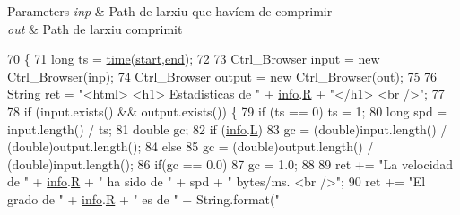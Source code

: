 \begin{DoxyParams}{Parameters}
{\em inp} & Path de l\textquotesingle{}arxiu que havíem de comprimir \\
\hline
{\em out} & Path de l\textquotesingle{}arxiu comprimit \\
\hline
\end{DoxyParams}

\begin{DoxyCode}
70                                                            \{
71         \textcolor{keywordtype}{long} ts = \hyperlink{classdomini_1_1estadistica_1_1Estadistica_a7587e21e3f7f177afe0dd36483c8fe5d}{time}(\hyperlink{classdomini_1_1estadistica_1_1Estadistica_aee0ae604272563ceab4e61392cbd343e}{start},\hyperlink{classdomini_1_1estadistica_1_1Estadistica_ae99e664f0569e308009ec7ca32864006}{end});
72 
73         Ctrl\_Browser input = \textcolor{keyword}{new} Ctrl\_Browser(inp);
74         Ctrl\_Browser output = \textcolor{keyword}{new} Ctrl\_Browser(out);
75 
76         String ret = \textcolor{stringliteral}{"<html> <h1> Estadisticas de "} + \hyperlink{classdomini_1_1estadistica_1_1Estadistica_a57776a71683b3717b638377073b8a99e}{info}.\hyperlink{classdomini_1_1utils_1_1Pair_aebf54d48000999b84e5e24a2c62088d4}{R} + \textcolor{stringliteral}{"</h1> <br />"};
77 
78         \textcolor{keywordflow}{if} (input.exists() && output.exists()) \{
79             \textcolor{keywordflow}{if} (ts == 0) ts = 1;
80             \textcolor{keywordtype}{long} spd = input.length() / ts;
81             \textcolor{keywordtype}{double} gc;
82             \textcolor{keywordflow}{if} (\hyperlink{classdomini_1_1estadistica_1_1Estadistica_a57776a71683b3717b638377073b8a99e}{info}.\hyperlink{classdomini_1_1utils_1_1Pair_a276a0eee9fa97fc27b37fab887f07cea}{L}) 
83                 gc = (double)input.length() / (double)output.length();
84             \textcolor{keywordflow}{else} 
85                 gc = (double)output.length() / (double)input.length();
86             \textcolor{keywordflow}{if}(gc == 0.0) 
87                 gc = 1.0;
88             
89             ret += \textcolor{stringliteral}{"La velocidad de "} + \hyperlink{classdomini_1_1estadistica_1_1Estadistica_a57776a71683b3717b638377073b8a99e}{info}.\hyperlink{classdomini_1_1utils_1_1Pair_aebf54d48000999b84e5e24a2c62088d4}{R} + \textcolor{stringliteral}{" ha sido de "} + spd + \textcolor{stringliteral}{" bytes/ms. <br />"};
90             ret += \textcolor{stringliteral}{"El grado de "} + \hyperlink{classdomini_1_1estadistica_1_1Estadistica_a57776a71683b3717b638377073b8a99e}{info}.\hyperlink{classdomini_1_1utils_1_1Pair_aebf54d48000999b84e5e24a2c62088d4}{R} + \textcolor{stringliteral}{" es de "} + String.format(\textcolor{stringliteral}{"%
}
\end{DoxyCode}
